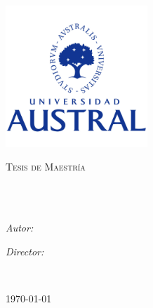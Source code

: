 \documentclass[
12pt, %
spanish, %
singlespacing, %
headsepline, %
]{MastersDoctoralThesis} %
\author{Ing. Franco \textsc{Lianza}}
\begin{document}
\frontmatter %

\pagestyle{plain} %


\begin{titlepage}
    \begin{center}

        \includegraphics[width=0.4\textwidth]{university}

        \vspace*{.06\textheight}
        \textsc{\Large Tesis de Maestría}\\[0.5cm] %

        \HRule \\[0.4cm] %
        {\Large \bfseries \ttitle\par}\vspace{0.4cm} %
        \HRule \\[1.5cm] %

        \begin{minipage}[t]{0.4\textwidth}
            \begin{flushleft} \large
                \emph{Autor:}\\
                \authorname
            \end{flushleft}
        \end{minipage}
        \begin{minipage}[t]{0.4\textwidth}
            \begin{flushright} \large
                \emph{Director:} \\
                \supname
            \end{flushright}
        \end{minipage}\\[3cm]

        \vfill

        {\large \today}\\[4cm]

        \vfill
    \end{center}
\end{titlepage}
\end{document}
